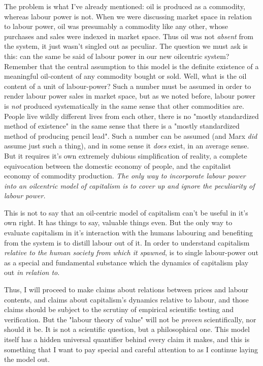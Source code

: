 \documentclass{article}
\theoremstyle{definition}
\theoremstyle{plain}
\theoremstyle{theorem}
\begin{document}
The problem is what I've already mentioned: oil is produced as a commodity, whereas labour power is not. When we were discussing market space in relation to labour power, oil was presumably a commodity like any other, whose purchases and sales were indexed in market space. Thus oil was not \textit{absent} from the system, it just wasn't singled out as peculiar. The question we must ask is this: can the same be said of labour power in our new oilcentric system? Remember that the central assumption to this model is the definite existence of a meaningful oil-content of any commodity bought or sold. Well, what is the oil content of a unit of labour-power? Such a number must be assumed in order to render labour power sales in market space, but as we noted before, labour power is \textit{not} produced systematically in the same sense that other commodities are. People live wildly different lives from each other, there is no "mostly standardized method of existence" in the same sense that there is a "mostly standardized method of producing pencil lead". Such a number can be assumed (and Marx \textit{did} assume just such a thing), and in some sense it \textit{does} exist, in an average sense. But it requires it's own extremely dubious simplification of reality, a complete equivocation between the domestic economy of people, and the capitalist economy of commodity production. \textit{The only way to incorporate labour power into an oilcentric model of capitalism is to cover up and ignore the peculiarity of labour power.} \par 
This is not to say that an oil-centric model of capitalism can't be useful in it's own right. It has things to say, valuable things even. But the only way to evaluate capitalism in it's interaction with the humans labouring and benefiting from the system is to distill labour out of it. In order to understand capitalism \textit{relative to the human society from which it spawned}, is to single labour-power out as a special and fundamental substance which the dynamics of capitalism play out \textit{in relation to}. \par 
Thus, I will proceed to make claims about relations between prices and labour contents, and claims about capitalism's dynamics relative to labour, and those claims should be subject to the scrutiny of empirical scientific testing and verification. But the "labour theory of value" will not be \textit{proven} scientifically, nor should it be. It is not a scientific question, but a philosophical one. This model itself has a hidden universal quantifier behind every claim it makes, and this is something that I want to pay special and careful attention to as I continue laying the model out. \par 
\end{document}
